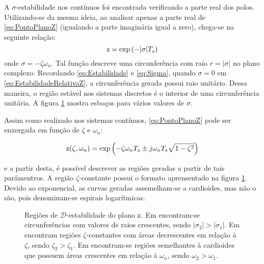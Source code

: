 A $\sigma$-estabilidade nos contínuos foi encontrada verificando a parte real dos polos. Utilizando-se da mesma ideia, ao analisar apenas a parte real de \eqref{eq:PontoPlanoZ} (igualando a parte imaginária igual a zero), chega-se na seguinte relação:
\begin{equation}
  \operatorname{\mathrm{z}} = \exp{\left(-|\sigma|T_s\right)}\label{eq:EstabilidadeRelativaZ}
\end{equation}
onde $\sigma = -\zeta\omega_n$. Tal função descreve uma circunferência com raio $r = |\sigma|$ no plano complexo. Recordando \eqref{eq:Estabilidade} e \eqref{eq:Sigma}, quando $\sigma = 0$ em \eqref{eq:EstabilidadeRelativaZ}, a circunferência gerada possui raio unitário. Dessa maneira, o região estável nos sistemas discretos é o interior de uma circunferência unitária. A figura \ref{subfig:EstabilidadeRelativaZ} mostra esboços para vários valores de $\sigma$. 

Assim como realizado nos sistemas contínuos, \eqref{eq:PontoPlanoZ} pode ser enxergada em função de $\zeta$ e $\omega_n$:

\begin{equation}
  \operatorname{\mathrm{z}}(\zeta,\omega_n) = \exp{\left(-\zeta\omega_nT_s \pm j\omega_nT_s\sqrt{1-\zeta^2}\right)}\label{eq:FuncaoPontoZ}
\end{equation}

\noindent e a partir desta, é possível descrever as regiões geradas a partir de tais parâmentros. A região $\zeta$-constante possui o formato aprensentado na figura \ref{subfig:EstabilidadeRelativaZ}. Devido ao exponencial, as curvas geradas assemelham-se a cardioides, mas não o são, pois denominam-se espirais logarítmicas.
\begin{figure}[!ht]
  \centering
  \begin{subfigure}[t]{0.3\columnwidth}
      
      \caption{}
      \label{subfig:EstabilidadeRelativaZ}
  \end{subfigure}
  \begin{subfigure}[t]{0.3\columnwidth}
      
      \caption{}
      \label{subfig:TaxaDeAmortecimentoZ}
  \end{subfigure}
  \begin{subfigure}[t]{0.3\columnwidth}
    
    \caption{}
    \label{subfig:OscilacaoNaoAmortecidaZ}
  \end{subfigure}
  \caption{Regiões de $\mathscr{D}$-estabilidade do plano $\operatorname{\mathrm{z}}$. Em  encontram-se circunferências com valores de raios crescentes, sendo $|\sigma_2| > |\sigma_1|$. Em  encontram regiões $\zeta$-constantes com áreas decrescentes em relação à $\zeta$, sendo $\zeta_2 > \zeta_1$. Em  encontram-se regiões semelhantes à cardioides que possuem áreas crescentes em relação à $\omega_n$, sendo $\omega_2 > \omega_1$.}
  \label{fig:RegioesPlanoZ}
\end{figure}

